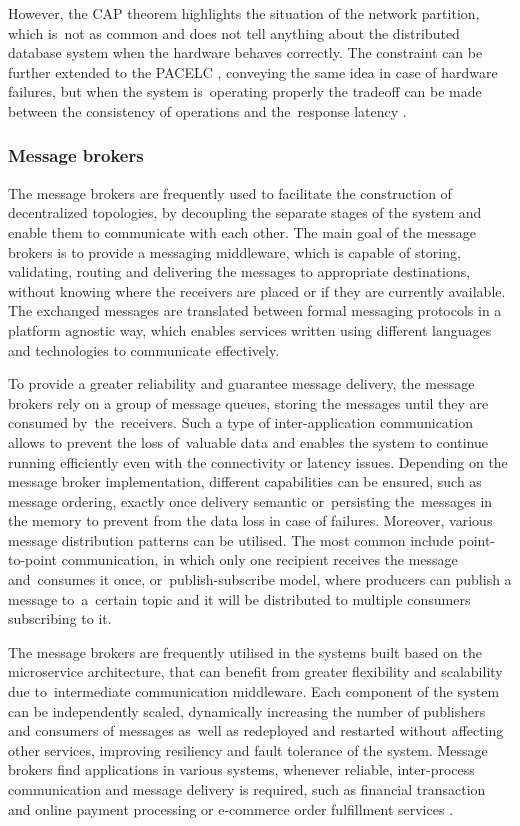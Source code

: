 However, the CAP theorem highlights the situation of the network partition, which is~not as common and does not tell anything about the distributed database system when the hardware behaves correctly. The constraint can be further extended to the PACELC \cite{PACELC}, conveying the same idea in case of hardware failures, but when the system is~operating properly the tradeoff can be made between the consistency of operations and the~response latency \cite{NoSQLDatabaseSystemsSurveyDecisionGuidance}.

\subsubsection{Message brokers} \label{chapter:message-brokers}

The message brokers are frequently used to facilitate the construction of decentralized topologies, by decoupling the separate stages of the system and enable them to communicate with each other. The main goal of the message brokers is to provide a messaging middleware, which is capable of storing, validating, routing and delivering the messages to appropriate destinations, without knowing where the receivers are placed or if they are currently available. The exchanged messages are translated between formal messaging protocols in a platform agnostic way, which enables services written using different languages and technologies to communicate effectively.

To provide a greater reliability and guarantee message delivery, the message brokers rely on a group of message queues, storing the messages until they are consumed by~the~receivers. Such a type of inter-application communication allows to prevent the loss of~valuable data and enables the system to continue running efficiently even with the connectivity or latency issues. Depending on the message broker implementation, different capabilities can be ensured, such as message ordering, exactly once delivery semantic or~persisting the~messages in the memory to prevent from the data loss in case of failures.
Moreover, various message distribution patterns can be utilised. The most common include point-to-point communication, in which only one recipient receives the message and~consumes it once, or~publish-subscribe model, where producers can publish a message to~a~certain topic and it will be distributed to multiple consumers subscribing to it.

The message brokers are frequently utilised in the systems built based on the microservice architecture, that can benefit from greater flexibility and scalability due to~intermediate communication middleware. Each component of the system can be independently scaled, dynamically increasing the number of publishers and consumers of messages as~well as redeployed and restarted without affecting other services, improving resiliency and fault tolerance of the system. Message brokers find applications in various systems, whenever reliable, inter-process communication and message delivery is required, such as financial transaction and online payment processing or e-commerce order fulfillment services \cite{MessageBrokers}.

